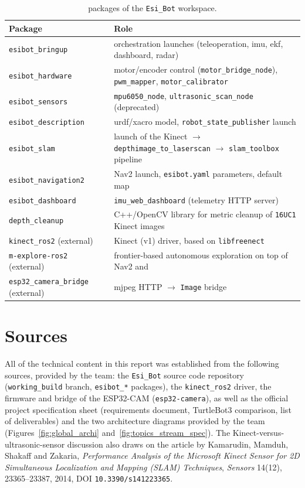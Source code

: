 \begin{table}[H]
	\centering
	\caption{\ros{} packages of the \texttt{Esi\_Bot} workspace.}
	\label{tab:packages_summary}
	\begin{tabularx}{\linewidth}{L{3.6cm} L{8.8cm}}
		\toprule
		\textbf{Package} & \textbf{Role} \\
		\midrule
		\texttt{esibot\_bringup} & orchestration launches (teleoperation, \gls{imu}, \gls{ekf}, dashboard, radar) \\
		\texttt{esibot\_hardware} & motor/encoder control (\texttt{motor\_bridge\_node}), \texttt{pwm\_mapper}, \texttt{motor\_calibrator} \\
		\texttt{esibot\_sensors} & \texttt{mpu6050\_node}, \texttt{ultrasonic\_scan\_node} (deprecated) \\
		\texttt{esibot\_description} & \gls{urdf}/xacro model, \texttt{robot\_state\_publisher} launch \\
		\texttt{esibot\_slam} & launch of the Kinect $\to$ \texttt{depthimage\_to\_laserscan} $\to$ \texttt{slam\_toolbox} pipeline \\
		\texttt{esibot\_navigation2} & Nav2 launch, \texttt{esibot.yaml} parameters, default map \\
		\texttt{esibot\_dashboard} & \texttt{imu\_web\_dashboard} (telemetry HTTP server) \\
		\texttt{depth\_cleanup} & C++/OpenCV library for metric cleanup of \texttt{16UC1} Kinect images \\
		\texttt{kinect\_ros2} (external) & Kinect (v1) driver, based on \texttt{libfreenect} \\
		\texttt{m-explore-ros2} (external) & frontier-based autonomous exploration on top of Nav2 and  \\
		\texttt{esp32\_camera\_bridge} (external) & \gls{mjpeg} HTTP $\to$ \ros{} \texttt{Image} bridge \\
		\bottomrule
	\end{tabularx}
\end{table}

\section{Sources}
\label{app:sources}

All of the technical content in this report was established from the following sources,
provided by the team: the \texttt{Esi\_Bot} source code repository (\texttt{working\_build}
branch, \texttt{esibot\_*} packages), the \texttt{kinect\_ros2} driver, the firmware and
\ros{} bridge of the ESP32-CAM (\texttt{esp32-camera}), as well as the official
\esibot{} project specification sheet (requirements document, TurtleBot3 comparison,
list of deliverables) and the two architecture diagrams provided by the team
(Figures~\ref{fig:global_archi} and~\ref{fig:topics_stream_spec}). The Kinect-versus-ultrasonic-sensor
discussion also draws on the article by Kamarudin, Mamduh, Shakaff and Zakaria,
\emph{Performance Analysis of the Microsoft Kinect Sensor for 2D Simultaneous
Localization and Mapping (SLAM) Techniques}, \emph{Sensors} 14(12), 23365--23387, 2014,
DOI \texttt{10.3390/s141223365}.
